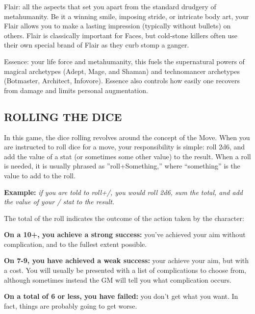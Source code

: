 \documentclass[oneside,10pt]{article}
\begin{document}
\begin{multicols}{2}
\begin{dent}
{\shadowrunbfont Flair:} all the aspects that set you apart from the
standard drudgery of metahumanity. Be it a winning smile, imposing
stride, or intricate body art, your Flair allows you to make a lasting
impression (typically without bullets) on others. Flair is classically
important for Faces, but cold-stone killers often use their own
special brand of Flair as they curb stomp a ganger. 

{\shadowrunbfont Essence:} your life force and metahumanity, this
fuels the supernatural powers of magical archetypes (Adept, Mage, and
Shaman) and technomancer archetypes (Botmaster, Architect,
Infovore). Essence also controls how easily one recovers from damage
and limits personal augmentation.

\vspace{.1cm}
\end{dent}

\subsection{ROLLING THE DICE}
\label{rollingdice}
In this game, the dice rolling revolves around the concept of
the Move. When you are instructed to roll dice for a move,
your responsibility is simple: roll 2d6, and add the value of
a stat (or sometimes some other value) to the result. When
a roll is needed, it is usually phrased as ''roll+Something,''
where ``something'' is the value to add to the roll.

\vspace{.1cm}
\begin{dent}
\textbf{Example:} \textit{if you are told to roll+\oomph/, you would roll
2d6, sum the total, and add the value of your \oomph/ stat to the result.}
\end{dent}
\vspace{.1cm}

The total of the roll indicates the outcome of the action taken
by the character:

\begin{dent}
\textbf{On a 10+, you achieve a strong success:} you’ve achieved
your aim without complication, and to the fullest extent
possible.

\textbf{On 7-9, you have achieved a weak success:} your achieve
your aim, but with a cost. You will usually be presented with a list of complications to choose from, although
sometimes instead the GM will tell you what complication
occurs.

\textbf{On a total of 6 or less, you have failed:} you don’t get
what you want. In fact, things are probably going to get
worse.
\end{dent}


\end{multicols}
\end{document}
